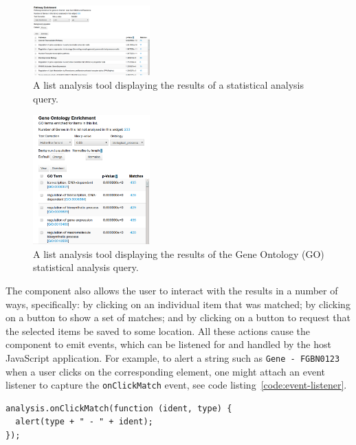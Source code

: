 \documentclass[10pt,a4paper,twocolumn]{article}
\begin{document}
\begin{figure}[htbp]
\centering
\includegraphics[width=0.4\textwidth]{pathway-enrichment.png}
\caption{\label{fig:pathways}A list analysis tool displaying the results of a
statistical analysis query.}
\end{figure}

\begin{figure}[hbp]
\centering
\includegraphics[width=0.4\textwidth]{go-enrichment.png}
\caption{\label{fig:go-enrichment}A list analysis tool displaying the results of the Gene Ontology (GO)
statistical analysis query.}
\end{figure}

The component also allows the user to interact with the results in a number of
ways, specifically: by clicking on an individual item that was matched; by
clicking on a button to show a set of matches; and by clicking on a button to
request that the selected items be saved to some location.  All these actions
cause the component to emit events, which can be listened for and handled by the
host JavaScript application. For example, to alert a string such as \texttt{Gene
- FGBN0123} when a user clicks on the corresponding element, one might attach an
event listener to capture the \texttt{onClickMatch} event, see code
listing~\ref{code:event-listener}.

\begin{lstlisting}[caption={Listening for a click event.}, label={code:event-listener}]
analysis.onClickMatch(function (ident, type) {
  alert(type + " - " + ident);
});
\end{lstlisting}
\end{document}
